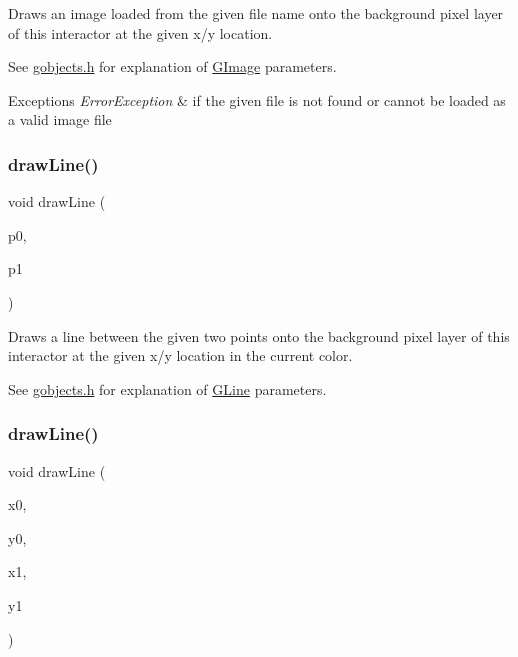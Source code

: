 Draws an image loaded from the given file name onto the background pixel layer of this interactor at the given x/y location. 

See \mbox{\hyperlink{gobjects_8h_source}{gobjects.\+h}} for explanation of \mbox{\hyperlink{classsgl_1_1GImage}{G\+Image}} parameters. 
\begin{DoxyExceptions}{Exceptions}
{\em Error\+Exception} & if the given file is not found or cannot be loaded as a valid image file \\
\hline
\end{DoxyExceptions}
\mbox{\label{classsgl_1_1GDrawingSurface_ae6a24b6b9a6e795d3165c1c750d5bdf1}} 
\subsubsection{\texorpdfstring{draw\+Line()}{drawLine()}\hspace{0.1cm}{\footnotesize\ttfamily [1/2]}}
{\footnotesize\ttfamily void draw\+Line (\begin{DoxyParamCaption}\item[{const \mbox{\hyperlink{structsgl_1_1GPoint}{G\+Point}} \&}]{p0,  }\item[{const \mbox{\hyperlink{structsgl_1_1GPoint}{G\+Point}} \&}]{p1 }\end{DoxyParamCaption})\hspace{0.3cm}{\ttfamily [virtual]}}



Draws a line between the given two points onto the background pixel layer of this interactor at the given x/y location in the current color. 

See \mbox{\hyperlink{gobjects_8h_source}{gobjects.\+h}} for explanation of \mbox{\hyperlink{classsgl_1_1GLine}{G\+Line}} parameters. \mbox{\label{classsgl_1_1GDrawingSurface_aff299fe83178d2f3ce8c08c06b583484}} 
\subsubsection{\texorpdfstring{draw\+Line()}{drawLine()}\hspace{0.1cm}{\footnotesize\ttfamily [2/2]}}
{\footnotesize\ttfamily void draw\+Line (\begin{DoxyParamCaption}\item[{double}]{x0,  }\item[{double}]{y0,  }\item[{double}]{x1,  }\item[{double}]{y1 }\end{DoxyParamCaption})\hspace{0.3cm}{\ttfamily [virtual]}}



